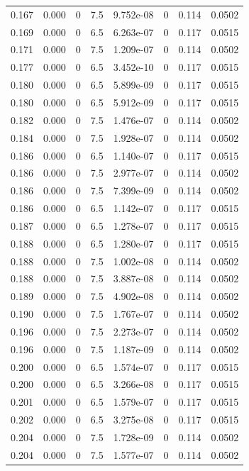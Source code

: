 \documentclass[preview]{standalone}
\begin{document}
{{{\begin{tabular}{L{1.2cm}C{1.2cm} C{0.3cm}C{0.5cm} C{1.4cm}C{1.4cm} C{1.4cm}C{1.4cm}}
  0.167  &  0.000  & 0     & 7.5 &  9.752e-08  & 0  & 0.114 &  0.0502   \\ 
  0.169  &  0.000  & 0     & 6.5 &  6.263e-07  & 0  & 0.117 &  0.0515   \\ 
  0.171  &  0.000  & 0     & 7.5 &  1.209e-07  & 0  & 0.114 &  0.0502   \\ 
  0.177  &  0.000  & 0     & 6.5 &  3.452e-10  & 0  & 0.117 &  0.0515   \\ 
  0.180  &  0.000  & 0     & 6.5 &  5.899e-09  & 0  & 0.117 &  0.0515   \\ 
  0.180  &  0.000  & 0     & 6.5 &  5.912e-09  & 0  & 0.117 &  0.0515   \\ 
  0.182  &  0.000  & 0     & 7.5 &  1.476e-07  & 0  & 0.114 &  0.0502   \\ 
  0.184  &  0.000  & 0     & 7.5 &  1.928e-07  & 0  & 0.114 &  0.0502   \\ 
  0.186  &  0.000  & 0     & 6.5 &  1.140e-07  & 0  & 0.117 &  0.0515   \\ 
  0.186  &  0.000  & 0     & 7.5 &  2.977e-07  & 0  & 0.114 &  0.0502   \\ 
  0.186  &  0.000  & 0     & 7.5 &  7.399e-09  & 0  & 0.114 &  0.0502   \\ 
  0.186  &  0.000  & 0     & 6.5 &  1.142e-07  & 0  & 0.117 &  0.0515   \\ 
  0.187  &  0.000  & 0     & 6.5 &  1.278e-07  & 0  & 0.117 &  0.0515   \\ 
  0.188  &  0.000  & 0     & 6.5 &  1.280e-07  & 0  & 0.117 &  0.0515   \\ 
  0.188  &  0.000  & 0     & 7.5 &  1.002e-08  & 0  & 0.114 &  0.0502   \\ 
  0.188  &  0.000  & 0     & 7.5 &  3.887e-08  & 0  & 0.114 &  0.0502   \\ 
  0.189  &  0.000  & 0     & 7.5 &  4.902e-08  & 0  & 0.114 &  0.0502   \\ 
  0.190  &  0.000  & 0     & 7.5 &  1.767e-07  & 0  & 0.114 &  0.0502   \\ 
  0.196  &  0.000  & 0     & 7.5 &  2.273e-07  & 0  & 0.114 &  0.0502   \\ 
  0.196  &  0.000  & 0     & 7.5 &  1.187e-09  & 0  & 0.114 &  0.0502   \\ 
  0.200  &  0.000  & 0     & 6.5 &  1.574e-07  & 0  & 0.117 &  0.0515   \\ 
  0.200  &  0.000  & 0     & 6.5 &  3.266e-08  & 0  & 0.117 &  0.0515   \\ 
  0.201  &  0.000  & 0     & 6.5 &  1.579e-07  & 0  & 0.117 &  0.0515   \\ 
  0.202  &  0.000  & 0     & 6.5 &  3.275e-08  & 0  & 0.117 &  0.0515   \\ 
  0.204  &  0.000  & 0     & 7.5 &  1.728e-09  & 0  & 0.114 &  0.0502   \\ 
  0.204  &  0.000  & 0     & 7.5 &  1.577e-07  & 0  & 0.114 &  0.0502   \\ 
\hline 
\end{tabular} 

}}}
\end{document}

